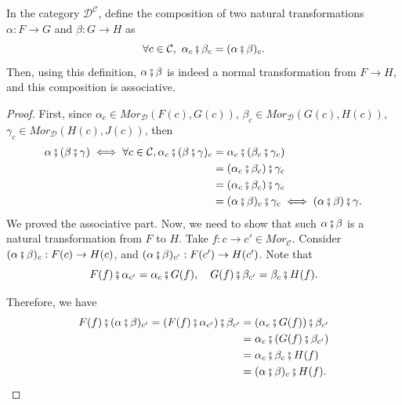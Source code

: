 \begin{proposition}
	In the category $\mathcal D^{\mathcal C}$, define the composition of two natural
	transformations $\alpha:F\to G$ and $\beta:G\to H$ as
	\begin{displaymath}
		\forall c \in \mathcal C, \ \alpha_c \fatsemi \beta_c = (\alpha \fatsemi \beta)_c.
	\end{displaymath}
	Then, using this definition, $\alpha \fatsemi \beta$ is indeed a normal transformation
	from $F \to H$, and this composition is associative.
\end{proposition}
\begin{proof}
	First, since
	$\alpha_c \in Mor_\mathcal D (F(c),G(c))$,
	$\beta_c \in Mor_\mathcal D (G(c),H(c))$,
	$\gamma_c \in Mor_\mathcal D (H(c),J(c))$,
	then
	\begin{align*}
		\alpha \fatsemi (\beta \fatsemi \gamma) \iff
		\forall c \in \mathcal C, \alpha_c \fatsemi (\beta \fatsemi \gamma)_c & =
		\alpha_c \fatsemi (\beta_c \fatsemi \gamma_c)                             \\&=
		(\alpha_c \fatsemi \beta_c) \fatsemi \gamma_c                             \\&=
		(\alpha_c \fatsemi \beta_c) \fatsemi \gamma_c                             \\&=
		(\alpha \fatsemi \beta)_c \fatsemi \gamma_c
		\iff (\alpha \fatsemi \beta) \fatsemi \gamma.
	\end{align*}
	We proved the associative part. Now, we need to show that such $\alpha \fatsemi \beta$
	is a natural transformation from $F$ to $H$. Take $f:c\to c' \in Mor_\mathcal C$.
	Consider $(\alpha \fatsemi \beta)_{c}:F(c) \to H(c)$, and
	$(\alpha\fatsemi \beta)_{c'}:F(c') \to H(c')$. Note that
	\begin{displaymath}
		F(f) \fatsemi \alpha_{c'} = \alpha_{c} \fatsemi G(f), \quad
		G(f) \fatsemi \beta_{c'} = \beta_{c} \fatsemi H(f).
	\end{displaymath}

	Therefore, we have
	\begin{align*}
		F(f) \fatsemi (\alpha\fatsemi \beta)_{c'} =
		(F(f) \fatsemi \alpha_{c'}) \fatsemi \beta_{c'} & =
		(\alpha_c \fatsemi G(f)) \fatsemi \beta_{c'}        \\&=
		\alpha_c \fatsemi (G(f) \fatsemi \beta_{c'})        \\&=
		\alpha_c \fatsemi \beta_c \fatsemi H(f)             \\&=
		(\alpha \fatsemi \beta)_c \fatsemi H(f).
	\end{align*}
\end{proof}


